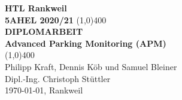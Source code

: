\begin{titlepage}
  \begin{center}
    \vspace*{1cm}
    \large{\textbf{HTL Rankweil}}\\
    \large{\textbf{5AHEL 2020/21}}
    \vfill
    \line(1,0){400}\\[1mm]
    \huge{\textbf{DIPLOMARBEIT}}\\[3mm]
    \large{\textbf{Advanced Parking Monitoring (APM)}}\\[1mm]
    \line(1,0){400}\\
    \vfill
    Philipp Kraft, Dennis Köb und Samuel Bleiner\\[3mm]
    Dipl.-Ing. Christoph Stüttler \\[6mm]
    \today, Rankweil
  \end{center}
\end{titlepage}

